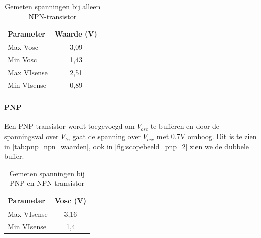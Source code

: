 \begin{table}[h!]
\centering
\begin{tabular}{|l|c|}
\hline
\textbf{Parameter} & \textbf{Waarde (V)} \\ \hline
Max Vosc & 3,09 \\ \hline
Min Vosc & 1,43 \\ \hline
Max VIsense & 2,51 \\ \hline
Min VIsense & 0,89 \\ \hline
\end{tabular}
\caption{Gemeten spanningen bij alleen NPN-transistor}
\label{tab:npn_waarden2}
\end{table}


\paragraph{PNP}
\label{par:pnp_npn_samen}
Een PNP transistor wordt toegevoegd om \(V_{osc}\) te bufferen en door de spanningsval over \(V_{be}\) gaat de spanning over \(V_{osc}\) met 0.7V omhoog. Dit is te zien in \autoref{tab:pnp_npn_waarden}, ook in \autoref{fig:scopebeeld_pnp_2} zien we de dubbele buffer.

\begin{table}[h!]
\centering
\begin{tabular}{|l|c|}
\hline
\textbf{Parameter} & \textbf{Vosc (V)} \\ \hline
Max VIsense & 3,16 \\ \hline
Min VIsense & 1,4 \\ \hline
\end{tabular}
\caption{Gemeten spanningen bij PNP en NPN-transistor}
\label{tab:pnp_npn_waarden}
\end{table}
